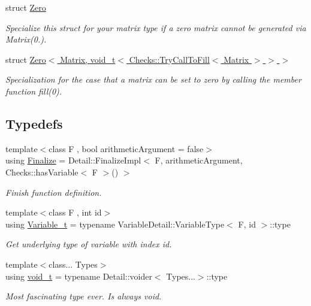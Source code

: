 \begin{DoxyCompactItemize}
struct \hyperlink{structFunG_1_1Zero}{Zero}
\begin{DoxyCompactList}\small\item\em Specialize this struct for your matrix type if a zero matrix cannot be generated via Matrix(0.). \end{DoxyCompactList}\item 
struct \hyperlink{structFunG_1_1Zero_3_01Matrix_00_01void__t_3_01Checks_1_1TryCallToFill_3_01Matrix_01_4_01_4_01_4}{Zero$<$ Matrix, void\-\_\-t$<$ Checks\-::\-Try\-Call\-To\-Fill$<$ Matrix $>$ $>$ $>$}
\begin{DoxyCompactList}\small\item\em Specialization for the case that a matrix can be set to zero by calling the member function fill(0). \end{DoxyCompactList}\end{DoxyCompactItemize}
\subsection*{Typedefs}
\begin{DoxyCompactItemize}
\item 
{\footnotesize template$<$class F , bool arithmetic\-Argument = false$>$ }\\using \hyperlink{namespaceFunG_ab2a52dfbc62e262c67f293fda5f81ef7}{Finalize} = Detail\-::\-Finalize\-Impl$<$ F, arithmetic\-Argument, Checks\-::has\-Variable$<$ F $>$() $>$
\begin{DoxyCompactList}\small\item\em Finish function definition. \end{DoxyCompactList}\item 
\hypertarget{namespaceFunG_a3d589ef7d011a46a72847eabcbbb4532}{{\footnotesize template$<$class F , int id$>$ }\\using \hyperlink{namespaceFunG_a3d589ef7d011a46a72847eabcbbb4532}{Variable\-\_\-t} = typename Variable\-Detail\-::\-Variable\-Type$<$ F, id $>$\-::type}\label{namespaceFunG_a3d589ef7d011a46a72847eabcbbb4532}

\begin{DoxyCompactList}\small\item\em Get underlying type of variable with index id. \end{DoxyCompactList}\item 
\hypertarget{namespaceFunG_a0cde667596590eb8d32e4a5ee76ddbb9}{{\footnotesize template$<$class... Types$>$ }\\using \hyperlink{namespaceFunG_a0cde667596590eb8d32e4a5ee76ddbb9}{void\-\_\-t} = typename Detail\-::voider$<$ Types...$>$\-::type}\label{namespaceFunG_a0cde667596590eb8d32e4a5ee76ddbb9}

\begin{DoxyCompactList}\small\item\em Most fascinating type ever. Is always void. \end{DoxyCompactList}\end{DoxyCompactItemize}
